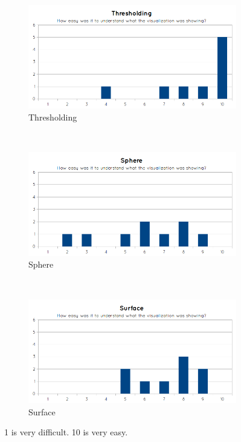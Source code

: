 \begin{figure}[H]
  \centering
  \begin{subfigure}[b]{0.32\textwidth}
    \includegraphics[width=\textwidth]{images/evaluation/graph_thresholding_1.png}
    \caption*{Thresholding}
    \label{fig:eval_visualization_q1_thresholding}
  \end{subfigure}%
  ~ %
  \begin{subfigure}[b]{0.32\textwidth}
    \includegraphics[width=\textwidth]{images/evaluation/graph_sphere_1.png}
    \caption*{Sphere}
    \label{fig:eval_visualization_q1_sphere}
  \end{subfigure}%
  ~ %
  \begin{subfigure}[b]{0.32\textwidth}
    \includegraphics[width=\textwidth]{images/evaluation/graph_surface_1.png}
    \caption*{Surface}
    \label{fig:eval_visualization_q1_surface}  
  \end{subfigure}
  \caption{1 is very difficult. 10 is very easy.}\label{fig:eval_visualization_q1}
\end{figure}

